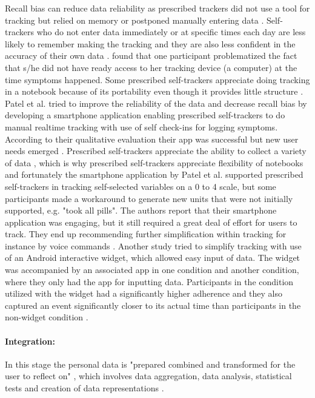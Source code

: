 Recall bias can reduce data reliability as prescribed trackers did not use a tool for tracking but relied on memory \citep{Patel2012} or postponed manually entering data \citep{MacLeod2014}. Self-trackers who do not enter data immediately or at specific times each day are less likely to remember making the tracking and they are also less confident in the accuracy of their own data \citep{MacLeod2014}. \citep{Li2010} found that one participant problematized the fact that s/he did not have ready access to her tracking device (a computer) at the time symptoms happened. Some prescribed self-trackers appreciate doing tracking in a notebook because of its portability even though it provides little structure \citep{MacLeod2014}. Patel et al. tried to improve the reliability of the data and decrease recall bias by developing a smartphone application enabling prescribed self-trackers to do manual realtime tracking with use of self check-ins for logging symptoms. According to their qualitative evaluation their app was successful but new user needs emerged \citep{Patel2012}. Prescribed self-trackers appreciate the ability to collect a variety of data \citep{MacLeod2014, Patel2012}, which is why prescribed self-trackers appreciate flexibility of notebooks \citep{MacLeod2014} and fortunately the smartphone application by Patel et al. supported prescribed self-trackers in tracking self-selected variables on a 0 to 4 scale, but some participants made a workaround to generate new units that were not initially supported, e.g. "took all pills". The authors report that their smartphone application was engaging, but it still required a great deal of effort for users to track. They end up recommending further simplification within tracking for instance by voice commands \citep{Patel2012}. Another study tried to simplify tracking with use of an Android interactive widget, which allowed easy input of data. The widget was accompanied by an associated app in one condition and another condition, where they only had the app for inputting data. Participants in the condition utilized with the widget had a significantly higher adherence and they also captured an event significantly closer to its actual time than participants in the non-widget condition \citep{Choe2015}. 

\paragraph{Integration:}
In this stage the personal data is "prepared combined and transformed for the user to reflect on" \citep{Li2010}, which involves data aggregation, data analysis, statistical tests and creation of data representations \citep{Li2010}. 

